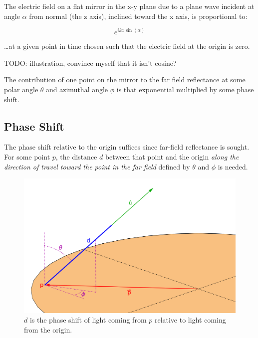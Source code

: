 \documentclass[etd,senior,noacknowledgments]{BYUPhys}
\begin{document}
The electric field on a flat mirror in the x-y plane due to a plane wave incident at angle $\alpha$ from normal (the z axis), inclined toward the x axis, is proportional to:

\begin{equation} \label{eq:efield}
  e^{ikx\sin\left({\alpha}\right)}
\end{equation}

\ldots at a given point in time chosen such that the electric field at the origin is zero.

TODO: illustration, convince myself that it isn't cosine?

The contribution of one point on the mirror to the far field reflectance at some polar angle $\theta$ and azimuthal angle $\phi$ is that exponential multiplied by some phase shift.

\subsection{Phase Shift} \label{sec:phase_shift}

The phase shift relative to the origin suffices since far-field reflectance is sought. For some point $p$, the distance $d$ between that point and the origin \textit{along the direction of travel toward the point in the far field} defined by $\theta$ and $\phi$ is needed.

\begin{figure}
  \centerline{\includegraphics[width=\textwidth]{phase-length}}
  \caption[Phase length of a beam of light]{\label{fig:phase_length}
    $d$ is the phase shift of light coming from $p$ relative to light coming from the origin.}
\end{figure}
\end{document}
